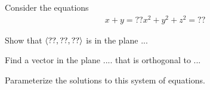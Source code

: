 \documentclass{ximera}
\author{Bart Snapp}
\begin{document}
Consider the equations
\begin{align*}
  x + y = ??
  x^2 + y^2 + z^2 = ??
\end{align*}

\begin{problem}
  Show that $\left\langle ??,??,??\right\rangle$ is in the plane ...
\end{problem}

\begin{problem}
  Find a vector in the plane .... that is orthogonal to ...
\end{problem}

\begin{problem}
  Parameterize the solutions to this system of equations. 
\end{problem}
\end{document}
